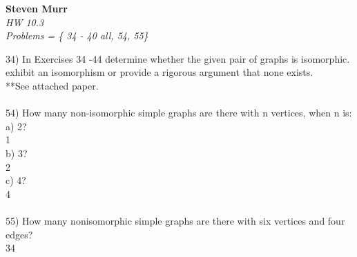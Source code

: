 \documentclass{article}
\begin{document}
\setcounter{totalnumber}{5}
   \begin{flushright}
      \Large\textbf{Steven Murr}\\
      \large\textit{HW 10.3} \\
      \large\textit{ Problems = \{ 34 - 40 all, 54, 55\} }
   \end{flushright}
\begin{flushleft}
\makeatletter%
\setlength{\@fptop}{5pt}
\makeatother
\setlength\parindent{0pt}34) In Exercises 34 -44 determine whether the given pair of graphs is isomorphic.  exhibit an isomorphism or provide a rigorous argument that none exists. \\
**See attached paper. \\
~\\
\setlength\parindent{0pt}54) How many non-isomorphic simple graphs are there with n vertices, when n is:  \\
\setlength\parindent{24pt}a) 2? \\
\setlength\parindent{48pt} 1 \\
\setlength\parindent{24pt}b) 3? \\
\setlength\parindent{48pt} 2 \\
\setlength\parindent{24pt}c) 4? \\
\setlength\parindent{48pt} 4 \\
~\\
\setlength\parindent{0pt}55) How many nonisomorphic simple graphs are there with six vertices and four edges? \\
\setlength\parindent{24pt} 34 \\

\end{flushleft}
\end{document}
